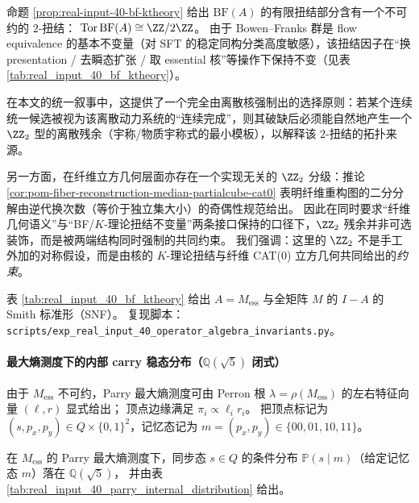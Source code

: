 \begin{remark}\label{rem:bf-z2-residual-gauge}
命题 \ref{prop:real-input-40-bf-ktheory} 给出 $\mathrm{BF}(A)$ 的有限扭结部分含有一个不可约的 $2$-扭结：
\(
\mathrm{Tor}\,\mathrm{BF}(A)\cong \ZZ/2\ZZ
\)。
由于 Bowen--Franks 群是 flow equivalence 的基本不变量（对 SFT 的稳定同构分类高度敏感），该扭结因子在“换 presentation / 去瞬态扩张 / 取 essential 核”等操作下保持不变（见表 \ref{tab:real_input_40_bf_ktheory}）。
\par
在本文的统一叙事中，这提供了一个完全由离散核强制出的选择原则：若某个连续统一候选被视为该离散动力系统的“连续完成”，则其破缺后必须能自然地产生一个 \(\ZZ_2\) 型的离散残余（宇称/物质宇称式的最小模板），以解释该 $2$-扭结的拓扑来源。
\par
另一方面，在纤维立方几何层面亦存在一个实现无关的 \(\ZZ_2\) 分级：推论 \ref{cor:pom-fiber-reconstruction-median-partialcube-cat0} 表明纤维重构图的二分分解由逆代换次数（等价于独立集大小）的奇偶性规范给出。
因此在同时要求“纤维几何语义”与“BF/\(K\)-理论扭结不变量”两条接口保持的口径下，\(\ZZ_2\) 残余并非可选装饰，而是被两端结构同时强制的共同约束。
我们强调：这里的 \(\ZZ_2\) 不是手工外加的对称假设，而是由核的 $K$-理论扭结与纤维 CAT(0) 立方几何共同给出的\emph{约束}。
\end{remark}

\begin{remark}\label{rem:real-input-40-bf-ktheory-repro}
表 \ref{tab:real_input_40_bf_ktheory} 给出 $A=M_{\mathrm{ess}}$ 与全矩阵 $M$ 的 $I-A$ 的 Smith 标准形（SNF）。
复现脚本：\texttt{scripts/exp\_real\_input\_40\_operator\_algebra\_invariants.py}。
\end{remark}


\paragraph{最大熵测度下的内部 carry 稳态分布（\texorpdfstring{$\mathbb Q(\sqrt5)$}{Q(sqrt5)} 闭式）}
由于 $M_{\mathrm{ess}}$ 不可约，Parry 最大熵测度可由 Perron 根 $\lambda=\rho(M_{\mathrm{ess}})$ 的左右特征向量 $(\ell,r)$ 显式给出；
顶点边缘满足 $\pi_i\propto \ell_i r_i$。
把顶点标记为 $(s,p_x,p_y)\in Q\times\{0,1\}^2$，记忆态记为 $m=(p_x,p_y)\in\{00,01,10,11\}$。

\begin{proposition}[真实输入核的内部同步态条件分布（闭式）]\label{prop:real-input-40-parry-internal-distribution}
在 $M_{\mathrm{ess}}$ 的 Parry 最大熵测度下，同步态 $s\in Q$ 的条件分布 $\mathbb{P}(s\mid m)$（给定记忆态 $m$）落在 $\mathbb Q(\sqrt5)$，
并由表 \ref{tab:real_input_40_parry_internal_distribution} 给出。
\end{proposition}


